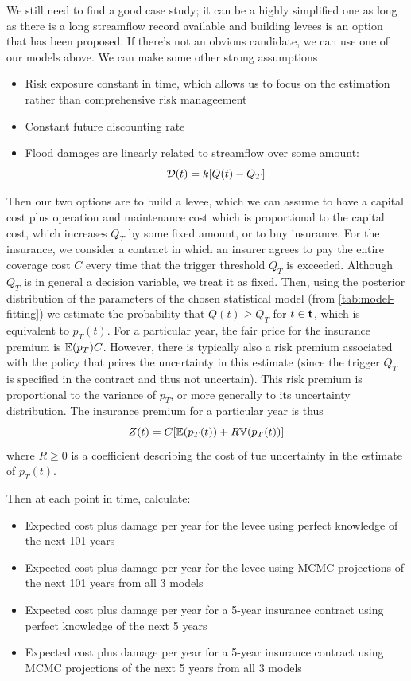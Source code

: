 \documentclass[12pt]{article}
\begin{document}
We still need to find a good case study; it can be a highly simplified one as long as there is a long streamflow record available and building levees is an option that has been proposed.
If there's not an obvious candidate, we can use one of our models above.
We can make some other strong assumptions
\begin{itemize}
  \item Risk exposure constant in time, which allows us to focus on the estimation rather than comprehensive risk manageement
  \item Constant future discounting rate
  \item Flood damages are linearly related to streamflow over some amount:
  \begin{equation}
    \mathcal{D}(t) = k \qty[ Q(t) - Q_T ]
  \end{equation}
\end{itemize}
Then our two options are to build a levee, which we can assume to have a capital cost plus operation and maintenance cost which is proportional to the capital cost, which increases \(Q_T\) by some fixed amount, or to buy insurance.
For the insurance, we consider a contract in which an insurer agrees to pay the entire coverage cost \(C\) every time that the trigger threshold \(Q_T\) is exceeded.
Although \(Q_T\) is in general a decision variable, we treat it as fixed.
Then, using the posterior distribution of the parameters of the chosen statistical model (from \cref{tab:model-fitting}) we estimate the probability that \(Q(t) \geq Q_T\) for \(t \in \vb{t}\), which is equivalent to \(p_T(t)\).
For a particular year, the fair price for the insurance premium is \(\mathbb{E} \qty(p_T) C\).
However, there is typically also a risk premium associated with the policy that prices the uncertainty in this estimate (since the trigger \(Q_T\) is specified in the contract and thus not uncertain).
This risk premium is proportional to the variance of \(p_T\), or more generally to its uncertainty distribution.
The insurance premium for a particular year is thus
\begin{equation} \label{eq:premium}
  Z(t) = C \qty[\mathbb{E} \qty(p_T(t)) + R \mathbb{V} \qty(p_T(t))]
\end{equation}
where \(R \geq 0\) is a coefficient describing the cost of tue uncertainty in the estimate of \(p_T(t)\).

Then at each point in time, calculate:
\begin{itemize}
  \item Expected cost plus damage per year for the levee using perfect knowledge of the next 101 years
  \item Expected cost plus damage per year for the levee using MCMC projections of the next 101 years from all 3 models
  \item Expected cost plus damage per year for a 5-year insurance contract using perfect knowledge of the next 5 years
  \item Expected cost plus damage per year for a 5-year insurance contract using MCMC projections of the next 5 years from all 3 models
\end{itemize}
\end{document}
